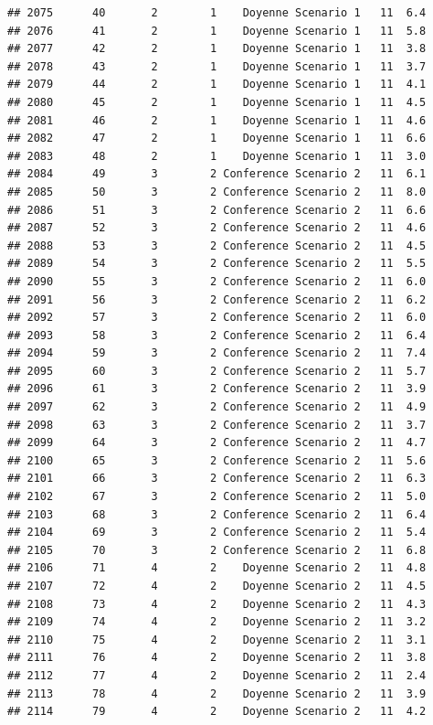 \documentclass[
]{article}
\begin{document}
\begin{verbatim}
## 2075      40       2        1    Doyenne Scenario 1   11  6.4
## 2076      41       2        1    Doyenne Scenario 1   11  5.8
## 2077      42       2        1    Doyenne Scenario 1   11  3.8
## 2078      43       2        1    Doyenne Scenario 1   11  3.7
## 2079      44       2        1    Doyenne Scenario 1   11  4.1
## 2080      45       2        1    Doyenne Scenario 1   11  4.5
## 2081      46       2        1    Doyenne Scenario 1   11  4.6
## 2082      47       2        1    Doyenne Scenario 1   11  6.6
## 2083      48       2        1    Doyenne Scenario 1   11  3.0
## 2084      49       3        2 Conference Scenario 2   11  6.1
## 2085      50       3        2 Conference Scenario 2   11  8.0
## 2086      51       3        2 Conference Scenario 2   11  6.6
## 2087      52       3        2 Conference Scenario 2   11  4.6
## 2088      53       3        2 Conference Scenario 2   11  4.5
## 2089      54       3        2 Conference Scenario 2   11  5.5
## 2090      55       3        2 Conference Scenario 2   11  6.0
## 2091      56       3        2 Conference Scenario 2   11  6.2
## 2092      57       3        2 Conference Scenario 2   11  6.0
## 2093      58       3        2 Conference Scenario 2   11  6.4
## 2094      59       3        2 Conference Scenario 2   11  7.4
## 2095      60       3        2 Conference Scenario 2   11  5.7
## 2096      61       3        2 Conference Scenario 2   11  3.9
## 2097      62       3        2 Conference Scenario 2   11  4.9
## 2098      63       3        2 Conference Scenario 2   11  3.7
## 2099      64       3        2 Conference Scenario 2   11  4.7
## 2100      65       3        2 Conference Scenario 2   11  5.6
## 2101      66       3        2 Conference Scenario 2   11  6.3
## 2102      67       3        2 Conference Scenario 2   11  5.0
## 2103      68       3        2 Conference Scenario 2   11  6.4
## 2104      69       3        2 Conference Scenario 2   11  5.4
## 2105      70       3        2 Conference Scenario 2   11  6.8
## 2106      71       4        2    Doyenne Scenario 2   11  4.8
## 2107      72       4        2    Doyenne Scenario 2   11  4.5
## 2108      73       4        2    Doyenne Scenario 2   11  4.3
## 2109      74       4        2    Doyenne Scenario 2   11  3.2
## 2110      75       4        2    Doyenne Scenario 2   11  3.1
## 2111      76       4        2    Doyenne Scenario 2   11  3.8
## 2112      77       4        2    Doyenne Scenario 2   11  2.4
## 2113      78       4        2    Doyenne Scenario 2   11  3.9
## 2114      79       4        2    Doyenne Scenario 2   11  4.2

\end{verbatim}
\end{document}
